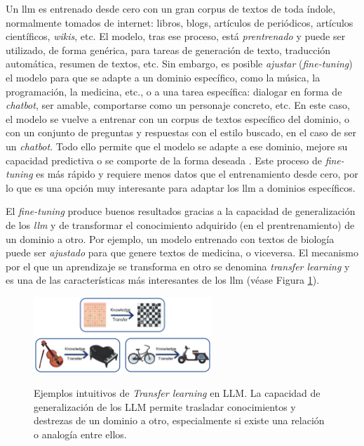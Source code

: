 Un \gls{llm} es entrenado desde cero con un gran corpus de textos de toda índole, normalmente tomados de internet: libros, blogs, artículos de periódicos, artículos científicos, \emph{wikis}, etc. El modelo, tras ese proceso, está \emph{prentrenado} \citep{hanPreTrainedModelsPresent2021} y puede ser utilizado, de forma genérica, para tareas de generación de texto, traducción automática, resumen de textos, etc. Sin embargo, es posible \emph{ajustar} (\emph{fine-tuning}) el modelo para que se adapte a un dominio específico, como la música, la programación, la medicina, etc., o a una tarea específica: dialogar en forma de \emph{chatbot}, ser amable, comportarse como un personaje concreto, etc. En este caso, el modelo se vuelve a entrenar con un corpus de textos específico del dominio, o con un conjunto de preguntas y respuestas con el estilo buscado, en el caso de ser un \emph{chatbot}. Todo ello permite que el modelo se adapte a ese dominio, mejore su capacidad predictiva o se comporte de la forma deseada \citep{tianFinetuningLanguageModels2023}. Este proceso de \emph{fine-tuning} es más rápido y requiere menos datos que el entrenamiento desde cero, por lo que es una opción muy interesante para adaptar los \gls{llm} a dominios específicos.

El \emph{fine-tuning} produce buenos resultados gracias a la capacidad de generalización de los \emph{llm} y de transformar el conocimiento adquirido (en el prentrenamiento) de un dominio a otro. Por ejemplo, un modelo entrenado con textos de biología puede ser \emph{ajustado} para que genere textos de medicina, o viceversa. El mecanismo por el que un aprendizaje se transforma en otro se denomina \emph{transfer learning} \citep{zhuangComprehensiveSurveyTransfer2020} y es una de las características más interesantes de los \gls{llm} (véase Figura \ref{fig:transfer_learning}).

\begin{figure}[H]
    \caption[Ejemplos intuitivos de \emph{Transfer learning} en LLM]{Ejemplos intuitivos de \emph{Transfer learning} en LLM. La capacidad de generalización de los LLM permite trasladar conocimientos y destrezas de un dominio a otro, especialmente si existe una relación o analogía entre ellos.}
    \centering
    \includegraphics[width=0.6\textwidth]{./figuras/transfer_learning.png}
    \label{fig:transfer_learning}
\end{figure}



